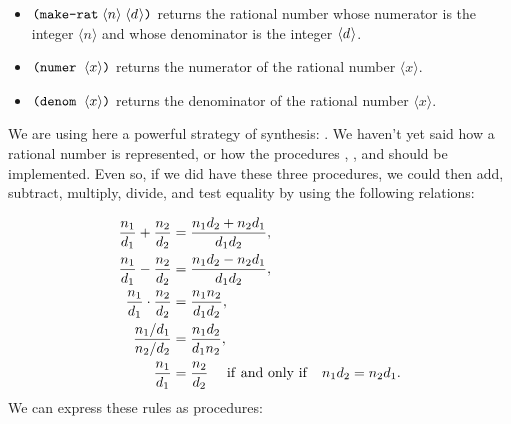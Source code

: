 \begin{itemize}

\item
\( \hbox{\tt(make-rat}\;\langle{n}\rangle\;\langle{d}\kern0.06em\rangle\hbox{\tt)} \) returns the rational number whose numerator is the integer \( \langle{n}\rangle \) and whose denominator is the integer
\( \langle{d}\kern0.06em\rangle \).

\item
\( \hbox{\tt(numer}\;\;\langle{x}\rangle\hbox{\tt)} \) returns the numerator of the rational number
\( \langle{x}\rangle \).

\item
\( \hbox{\tt(denom}\;\;\langle{x}\rangle\hbox{\tt)} \) returns the denominator of the rational number
\( \langle{x}\rangle \).

\end{itemize}

\noindent
We are using here a powerful strategy of synthesis: .
We haven't yet said how a rational number is represented, or how the procedures
, , and  should be implemented.  Even
so, if we did have these three procedures, we could then add, subtract,
multiply, divide, and test equality by using the following relations:
\begin{comment}

\begin{example}
n_1   n_2   n_1 d_2 + n_2 d_1
--- + --- = -----------------
d_1   d_2        d_1 d_2

n_1   n_2   n_1 d_2 - n_2 d_1
--- - --- = -----------------
d_1   d_2        d_1 d_2

n_1   n_2   n_1 n_2
--- * --- = -------
d_1   d_2   d_1 d_2

n_1 / d_1   n_1 d_2
--------- = -------
n_2 / d_2   d_1 n_2

n_1   n_2
--- = ---  if and only if n_1 d_2 = n_2 d_1
d_1   d_2
\end{example}
\end{comment}
\begin{align*}
  {n_1 \over d_1} + {n_2 \over d_2} 	&= {n_1 d_2 + n_2 d_1 \over d_1 d_2}, \\
  {n_1 \over d_1} - {n_2 \over d_2} 	&= {n_1 d_2 - n_2 d_1 \over d_1 d_2}, \\
  {n_1 \over d_1} \cdot {n_2 \over d_2}	&= {n_1 n_2 \over d_1 d_2}, \\
  {n_1 / d_1} \over {n_2 / d_2} 	&= {n_1 d_2 \over d_1 n_2}, \\
  {n_1 \over d_1} 			&= {n_2 \over d_2} \quad
						{\rm\ if\ and\ only\ if\quad}
						n_1 d_2 = n_2 d_1.
\end{align*}
\noindent
We can express these rules as procedures:

